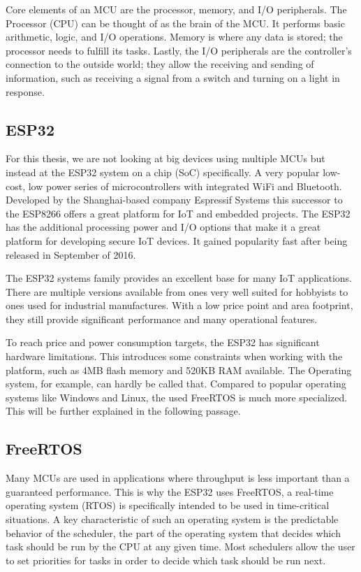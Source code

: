 Core elements of an MCU are the processor, memory, and I/O peripherals. The Processor (CPU) can be thought of as the brain of the MCU. It performs basic arithmetic, logic, and I/O operations. Memory is where any data is stored; the processor needs to fulfill its tasks. Lastly, the I/O peripherals are the controller's connection to the outside world; they allow the receiving and sending of information, such as receiving a signal from a switch and turning on a light in response.

\subsection{ESP32}
For this thesis, we are not looking at big devices using multiple MCUs but instead at the ESP32 system on a chip (SoC) specifically. A very popular low-cost, low power series of microcontrollers with integrated WiFi and Bluetooth. Developed by the Shanghai-based company Espressif Systems this successor to the ESP8266 offers a great platform for IoT and embedded projects\autocite{noauthor_esp32_nodate}. The ESP32 has the additional processing power and I/O options that make it a great platform for developing secure IoT devices. It gained popularity fast after being released in September of 2016.

The ESP32 systems family provides an excellent base for many IoT applications. There are multiple versions available from ones very well suited for hobbyists to ones used for industrial manufactures. With a low price point and area footprint, they still provide significant performance and many operational features\autocite{maier_comparative_2017}.

To reach price and power consumption targets, the ESP32 has significant hardware limitations. This introduces some constraints when working with the platform, such as 4MB flash memory and 520KB RAM available. The Operating system, for example, can hardly be called that. Compared to popular operating systems like Windows and Linux, the used FreeRTOS is much more specialized. This will be further explained in the following passage.

\subsection{FreeRTOS}\label{subsec:freertos}

Many MCUs are used in applications where throughput is less important than a guaranteed performance. This is why the ESP32 uses FreeRTOS, a real-time operating system (RTOS) is specifically intended to be used in time-critical situations. A key characteristic of such an operating system is the predictable behavior of the scheduler, the part of the operating system that decides which task should be run by the CPU at any given time. Most schedulers allow the user to set priorities for tasks in order to decide which task should be run next.

